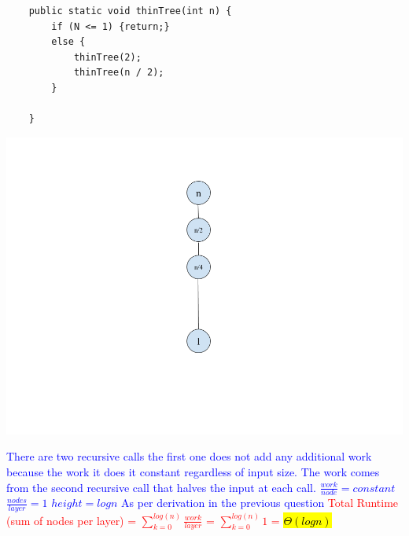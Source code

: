 \documentclass[11pt,letterpaper]{article}
\begin{document}
\newpage
\begin{lstlisting}
    public static void thinTree(int n) {
        if (N <= 1) {return;}
        else {
            thinTree(2);
            thinTree(n / 2);
        }
        
    }
\end{lstlisting}
\begin{center}
    \includegraphics[scale=0.35]{images/thinTree.png}    
\end{center}

\textcolor{blue}{
There are two recursive calls the first one does not add any additional work because the work it does it constant regardless of input size. The work comes from the second recursive call that halves the input at each call. 
\newline
\newline
$\frac{work}{node} = constant$ 
\newline
\newline
$\frac{nodes}{layer} = 1$
\newline
\newline
$height = logn$ As per derivation in the previous question 
\newline
\newline
}
\textcolor{red}{Total Runtime (sum of nodes per layer) = $\sum_{k=0}^{log(n)}\frac{work}{layer}$ = $\sum_{k=0}^{log(n)}1$ = \hl{$\Theta(logn)$}}
\end{document}
